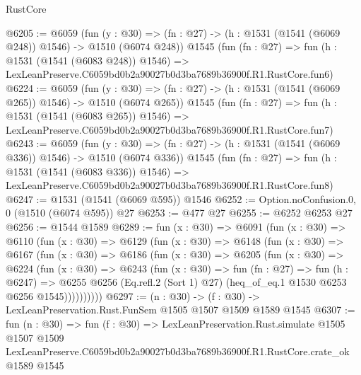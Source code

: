 \begin{lexlean}{RustCore}
\begin{coremodule}
@6205 := @6059
    (fun (y : @30) => (fn : @27) -> (h : @1531 (@1541 (@6069 @248)) @1546) -> @1510 (@6074 @248))
    @1545
    (fun (fn : @27) =>
    fun (h : @1531 (@1541 (@6083 @248)) @1546) =>
    LexLeanPreserve.C6059bd0b2a90027b0d3ba7689b36900f.R1.RustCore.fun6)
@6224 := @6059
    (fun (y : @30) => (fn : @27) -> (h : @1531 (@1541 (@6069 @265)) @1546) -> @1510 (@6074 @265))
    @1545
    (fun (fn : @27) =>
    fun (h : @1531 (@1541 (@6083 @265)) @1546) =>
    LexLeanPreserve.C6059bd0b2a90027b0d3ba7689b36900f.R1.RustCore.fun7)
@6243 := @6059
    (fun (y : @30) => (fn : @27) -> (h : @1531 (@1541 (@6069 @336)) @1546) -> @1510 (@6074 @336))
    @1545
    (fun (fn : @27) =>
    fun (h : @1531 (@1541 (@6083 @336)) @1546) =>
    LexLeanPreserve.C6059bd0b2a90027b0d3ba7689b36900f.R1.RustCore.fun8)
@6247 := @1531 (@1541 (@6069 @595)) @1546
@6252 := Option.noConfusion.{0, 0} (@1510 (@6074 @595)) @27
@6253 := @477 @27
@6255 := @6252 @6253 @27
@6256 := @1544 @1589
@6289 := fun (x : @30) =>
  @6091
    (fun (x : @30) =>
    @6110
      (fun (x : @30) =>
      @6129
        (fun (x : @30) =>
        @6148
          (fun (x : @30) =>
          @6167
            (fun (x : @30) =>
            @6186
              (fun (x : @30) =>
              @6205
                (fun (x : @30) =>
                @6224
                  (fun (x : @30) =>
                  @6243
                    (fun (x : @30) =>
                    fun (fn : @27) =>
                    fun (h : @6247) =>
                    @6255
                      @6256
                      (Eq.refl.{2} (Sort 1) @27)
                      (heq_of_eq.{1} @1530 @6253 @6256 @1545))))))))))
@6297 := (n : @30) -> (f : @30) -> LexLeanPreservation.Rust.FunSem @1505 @1507 @1509 @1589 @1545
@6307 := fun (n : @30) =>
  fun (f : @30) =>
  LexLeanPreservation.Rust.simulate
    @1505
    @1507
    @1509
    LexLeanPreserve.C6059bd0b2a90027b0d3ba7689b36900f.R1.RustCore.crate_ok
    @1589
    @1545
\end{coremodule}
\end{lexlean}
